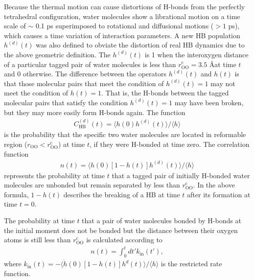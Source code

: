 Because the thermal motion can cause distortions of H-bonds from the perfectly tetrahedral configuration,
water molecules show a librational motion on a time scale of $\sim$ 0.1 ps superimposed to rotational and diffusional motions ($> 1$ ps), 
which causes a time variation of interaction parameters.
A new HB population $h^{(d)}(t)$ was also defined to obviate the distortion of real HB dynamics
due to the above geometric definition. \cite{Sciortino1989,AC00}
The $h^{(d)}(t)$ is 1 when the interoxygen distance of a particular tagged pair of water molecules is less than $r^{\text{c}}_{\text{OO}}=3.5$ \AA at time $t$ and 0 otherwise. 
The difference between the operators $h^{(d)}(t)$ and $h(t)$ is that those molecular pairs that meet the condition of $h^{(d)}(t)=1$ may not meet the condition of $h(t)=1$.
That is, the H-bonds between the tagged molecular pairs that satisfy the condition $h^{(d)}(t)=1$ may have been broken, but they may more easily form H-bonds again.
The function 
\begin{eqnarray}
  C^{(d)}_{\text{HB}}(t)=\langle h(0)h^{(d)}(t) \rangle/\langle h\rangle
\label{eq:C_HB_d}
\end{eqnarray}
is the probability that the specific two water molecules are located in reformable region ($r_{\text{OO}} < r^{\text{c}}_{\text{OO}}$) at time $t$,
if they were H-bonded at time zero. 
The correlation function 
%
\begin{eqnarray}
n(t)=\langle h(0)[1-h(t)]h^{(d)}(t) \rangle/\langle h\rangle 
\label{eq:n_HB}
\end{eqnarray}
represents the probability at time $t$ 
that a tagged pair of initially H-bonded water molecules are unbonded but remain separated by less than $r_{\text{OO}}^{\text{c}}$.
In the above formula, $1-h(t)$ describes the breaking of a HB at time $t$ after its formation at time $t=0$.

The probability at time $t$ that a pair of water molecules bonded by H-bonds at the initial moment does not be bonded 
but the distance between their oxygen atoms is still less than $r_\text{OO}^c$ is calculated according to 
\begin{eqnarray}
n(t) = \int_0^t dt'k_\text{in}(t'),
\label{eq:n_from_k_in}
\end{eqnarray}
where $k_\text{in}(t) = -\langle \dot h(0)[1-h(t)]h^d(t) \rangle/\langle h\rangle$ is the restricted rate function. 
\FloatBarrier
